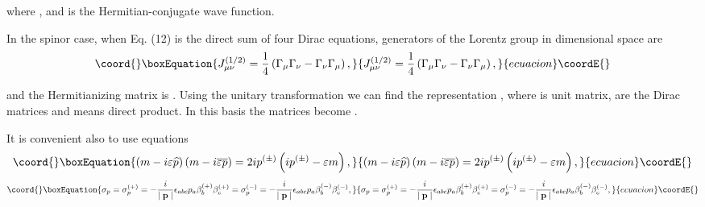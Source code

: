 \documentclass[a4paper,12pt]{article}
\begin{document}
where \coordHE{}, and \myHighlight{$\Psi
^{+}$}\coordHE{} is the Hermitian-conjugate wave function.

In the spinor case, when Eq. (12) is the direct sum of four Dirac equations,
generators of the Lorentz group in \coordHE{}dimensional space are
\begin{equation}\coord{}\boxEquation{
J_{\mu \nu }^{(1/2)}=\frac 14\left( \Gamma _\mu \Gamma _\nu
-\Gamma _\nu \Gamma _\mu \right) , \label{37}
}{
J_{\mu \nu }^{(1/2)}=\frac 14\left( \Gamma _\mu \Gamma _\nu
-\Gamma _\nu \Gamma _\mu \right) , }{ecuacion}\coordE{}\end{equation}

and the Hermitianizing matrix is \coordHE{}. Using the
unitary transformation we can find the representation \coordHE{}, where \coordHE{} is \coordHE{}unit matrix, \myHighlight{$\gamma
_\mu $}\coordHE{} are the Dirac matrices and \myHighlight{$\otimes $}\coordHE{} means direct product. In this
basis the matrices \myHighlight{$\overline{\Gamma }_\mu $}\coordHE{} become \coordHE{}.

It is convenient also to use equations
\begin{equation}\coord{}\boxEquation{
\left( m-i\varepsilon \widehat{p}\right) \left(
m-i\overline{\varepsilon } \overline{p}\right) =2ip^{(\pm )}\left(
ip^{(\pm )}-\varepsilon m\right) ,\label{38}
}{
\left( m-i\varepsilon \widehat{p}\right) \left(
m-i\overline{\varepsilon } \overline{p}\right) =2ip^{(\pm )}\left(
ip^{(\pm )}-\varepsilon m\right) ,}{ecuacion}\coordE{}\end{equation}
\begin{equation}\coord{}\boxEquation{
\sigma _p=\sigma _p^{(+)}=-\frac i{\mid \mathbf{p}\mid }\epsilon
_{abc}p_a\beta _b^{(+)}\beta _c^{(+)}=\sigma _p^{(-)}=-\frac
i{\mid \mathbf{p }\mid }\epsilon _{abc}p_a\beta _b^{(-)}\beta
_c^{(-)} , \label{39}
}{
\sigma _p=\sigma _p^{(+)}=-\frac i{\mid \mathbf{p}\mid }\epsilon
_{abc}p_a\beta _b^{(+)}\beta _c^{(+)}=\sigma _p^{(-)}=-\frac
i{\mid \mathbf{p }\mid }\epsilon _{abc}p_a\beta _b^{(-)}\beta
_c^{(-)} , }{ecuacion}\coordE{}\end{equation}
\end{document}
